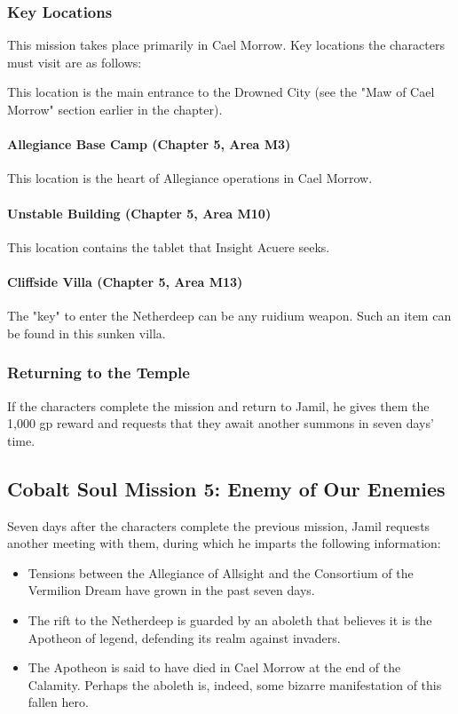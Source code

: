 \documentclass[10pt,a4paper,twoside,bg=print,twocolumn,openany,nodeprecatedcode]{dndbook}
\begin{document}
\subsubsection{Key Locations}
This mission takes place primarily in Cael Morrow. Key locations the characters must visit are as follows:


\begin{description}[nolistsep]
\item[Maw of Cael Morrow.]
This location is the main entrance to the Drowned City (see the "Maw of Cael Morrow" section earlier in the chapter).
\end{description}

\paragraph{Allegiance Base Camp (Chapter 5, Area M3)}
This location is the heart of Allegiance operations in Cael Morrow.

\paragraph{Unstable Building (Chapter 5, Area M10)}
This location contains the tablet that Insight Acuere seeks.

\paragraph{Cliffside Villa (Chapter 5, Area M13)}
The "key" to enter the Netherdeep can be any ruidium weapon. Such an item can be found in this sunken villa.

\subsubsection{Returning to the Temple}
If the characters complete the mission and return to Jamil, he gives them the 1,000 gp reward and requests that they await another summons in seven days' time.

\subsection{Cobalt Soul Mission 5: Enemy of Our Enemies}
Seven days after the characters complete the previous mission, Jamil requests another meeting with them, during which he imparts the following information:


\begin{itemize}
\item Tensions between the Allegiance of Allsight and the Consortium of the Vermilion Dream have grown in the past seven days.
\item The rift to the Netherdeep is guarded by an aboleth that believes it is the Apotheon of legend, defending its realm against invaders.
\item The Apotheon is said to have died in Cael Morrow at the end of the Calamity. Perhaps the aboleth is, indeed, some bizarre manifestation of this fallen hero.
\end{itemize}
\end{document}
